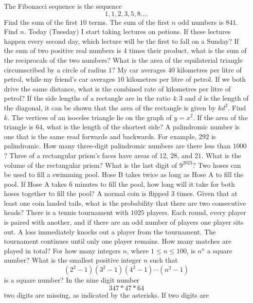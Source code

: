 \documentclass[a4paper,12pt]{exam}
\begin{document}
\begin{questions}
  \question The Fibonacci sequence is the sequence \[1,1,2,3,5,8\ldots.\] Find the sum of the first \(10\) terms.
  \question The sum of the first \(n\) odd numbers is \(841\). Find \(n\).
  \question Today (Tuesday) I start taking lectures on potions. If these lectures
  happen every second day, which lecture will be the first to fall on a Sunday?
  \question If the sum of two positive real numbers is \(4\) times their product, what is the sum of the reciprocals of the
  two numbers?
  \question What is the area of the equilaterial triangle circumscribed by a circle of radius \(1\)?
  \question My car averages \(40\) kilometres per litre of petrol, while my friend's car averages
  \(10\) kilometres per litre of petrol. If we both drive the same distance, what is the combined rate
  of kilometres per litre of petrol?
  \question If the side lengths of a rectangle are in the ratio \(4:3\) and \(d\) is the length of the diagonal, it can be shown that the area
  of the rectangle is given by \(kd^2\). Find \(k\).
  \question The vertices of an isoceles triangle lie on the graph of \(y=x^2\). If the area of the triangle
  is \(64\), what is the length of the shortest side?
  \question A palindromic number is one that is the same read forwards and backwards. For example, \(292\)
  is palindromic. How many three-digit palindromic numbers are there less than \(1000\)?
  \question Three of a rectangular prism's faces have areas of \(12\), \(28\), and \(21\). What is the volume of the rectangular prism?
  \question What is the last digit of \(9^{2023}\)?
  \question Two hoses can be used to fill a swimming pool. Hose B takes twice as long as Hose A to fill the pool.
  If Hose A takes \(6\) minutes to fill the pool, how long will it take for both hoses together to fill the pool?
  \question A normal coin is flipped \(3\) times. Given that at least one coin landed tails, what is the probability
  that there are two consecutive heads?
  \question There is a tennis tournament with \(1025\) players. Each round, every player is paired with another, and if
  there are an odd number of players one player sits out. A loss immediately knocks out a player from the tournament. The tournament
  continues until only one player remains. How many matches are played in total?
  \question For how many integers \(n\), where \(1\le n\le 100\), is \(n^n\) a square number?
  \question What is the smallest positive integer \(n\) such that \[(2^2-1)(3^2-1)(4^2-1)\cdots(n^2-1)\] is a square number?
  \question In the nine digit number \[347*47*64\] two digits are missing, as indicated by the asterisks. If two digits are

\end{questions}
\end{document}
